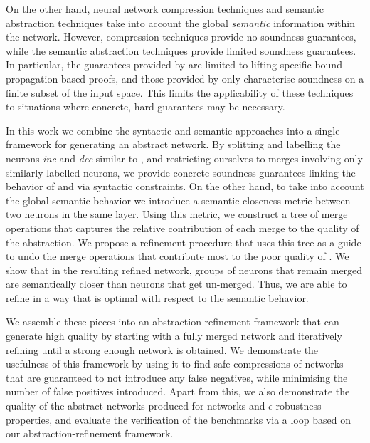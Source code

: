 On the other hand, neural network compression techniques \cite{dnn-compression}
and semantic abstraction techniques \cite{deep-abstract, lin-comb-abs-jan} take
into account the global \textit{semantic} information within the network.
However,
compression techniques provide no soundness guarantees, while the semantic
abstraction techniques provide limited soundness guarantees. In particular, the
guarantees provided by \cite{deep-abstract} are limited to lifting specific
bound propagation based proofs, and those provided by \cite{lin-comb-abs-jan}
only characterise soundness on a finite subset of the input space. This limits
the applicability of these techniques to situations where concrete, hard
guarantees may be necessary.

In this work we combine the syntactic and semantic approaches into a single
framework for generating an abstract network. By splitting and labelling the
neurons \textit{inc} and \textit{dec} similar to \cite{cegar-nn}, and
restricting ourselves to merges involving only similarly labelled neurons, we
provide concrete soundness guarantees linking the behavior of \cnc and \abs via
syntactic constraints.
On the other hand, to take into account the global semantic behavior we
introduce a semantic closeness metric between two neurons in the same layer.
Using this metric, we construct a tree of merge operations that 
captures the relative contribution of each merge to the quality of the
abstraction. We propose a refinement procedure that uses this
tree as a guide to undo the merge operations that
contribute most to the poor quality of \abs.  We show that in the resulting
refined network, groups of neurons that remain merged are semantically closer
than neurons that get un-merged. Thus, we are able to refine \abs in a way that
is optimal with respect to the semantic behavior.

We assemble these pieces into an abstraction-refinement framework that can
generate high quality \abs by starting with a fully merged network and
iteratively refining until a strong enough network is obtained. We demonstrate
the usefulness of this framework by using it to find safe compressions of \mnist
networks that are guaranteed to not introduce any false negatives, while
minimising the number of false positives introduced. Apart from this, we also
demonstrate the quality of the abstract networks produced for \mnist networks
and $\epsilon$-robustness properties, and evaluate the verification of the
\acasxu benchmarks via a \cegar loop based on our abstraction-refinement
framework.
